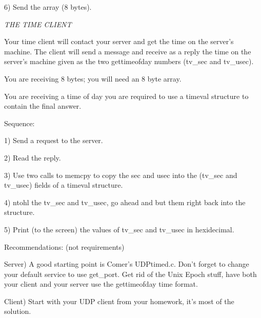 6) Send the array (8 bytes).

\noindent
{\it THE TIME CLIENT}

Your time client will contact your server and get the time on the server's 
machine.
The client will send a  message and receive as a reply the
time on the server's machine given as the two {\ltt{}gettimeofday} numbers
({\ltt{}tv_sec} and {\ltt{}tv_usec}).

You are receiving 8 bytes; you will need an 8 byte array.

You are receiving a time of day you are required to
use a {\ltt{}timeval} structure to contain the final answer.

Sequence:

1) Send a request to the server.

2) Read the reply.

3) Use two calls to {\ltt{}memcpy} to copy the sec and usec into
the ({\ltt{}tv_sec} and {\ltt{}tv_usec}) fields of a {\ltt{}timeval}
structure.

4) ntohl the {\ltt{}tv_sec} and {\ltt{}tv_usec},
go ahead and but them right back into the structure.

5) Print (to the screen) the values of
{\ltt{}tv_sec} and {\ltt{}tv_usec} in hexidecimal.

\bigskip
Recommendations: (not requirements)

Server)
A good starting point is Comer's {\ltt{}UDPtimed.c}.
Don't forget to change your default {\ltt{}service} to use
{\ltt{}get_port}.
Get rid of the Unix Epoch stuff, have both your client and your server
use the {\ltt{}gettimeofday} time format.

Client) 
Start with your UDP client from your homework, it's most of the solution.
\bye
